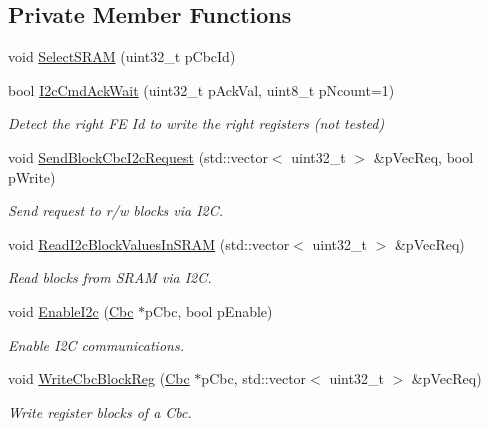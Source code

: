 \subsection*{Private Member Functions}
\begin{DoxyCompactItemize}
\item 
void \hyperlink{class_ph2___hw_interface_1_1_cbc_interface_acd3d4688c3f92b5ddd0d37456c8228df}{Select\-S\-R\-A\-M} (uint32\-\_\-t p\-Cbc\-Id)
\item 
bool \hyperlink{class_ph2___hw_interface_1_1_cbc_interface_ad171e07d3777cebcdd1f65cc03915e7b}{I2c\-Cmd\-Ack\-Wait} (uint32\-\_\-t p\-Ack\-Val, uint8\-\_\-t p\-Ncount=1)
\begin{DoxyCompactList}\small\item\em Detect the right F\-E Id to write the right registers (not tested) \end{DoxyCompactList}\item 
void \hyperlink{class_ph2___hw_interface_1_1_cbc_interface_a89fb26e8441039ffa635ce189ab034be}{Send\-Block\-Cbc\-I2c\-Request} (std\-::vector$<$ uint32\-\_\-t $>$ \&p\-Vec\-Req, bool p\-Write)
\begin{DoxyCompactList}\small\item\em Send request to r/w blocks via I2\-C. \end{DoxyCompactList}\item 
void \hyperlink{class_ph2___hw_interface_1_1_cbc_interface_a5bffbf2ff373386ed92f8823ebe2cef3}{Read\-I2c\-Block\-Values\-In\-S\-R\-A\-M} (std\-::vector$<$ uint32\-\_\-t $>$ \&p\-Vec\-Req)
\begin{DoxyCompactList}\small\item\em Read blocks from S\-R\-A\-M via I2\-C. \end{DoxyCompactList}\item 
void \hyperlink{class_ph2___hw_interface_1_1_cbc_interface_a03c443239c9ee90a9d547fbcfed89df4}{Enable\-I2c} (\hyperlink{class_ph2___hw_description_1_1_cbc}{Cbc} $\ast$p\-Cbc, bool p\-Enable)
\begin{DoxyCompactList}\small\item\em Enable I2\-C communications. \end{DoxyCompactList}\item 
void \hyperlink{class_ph2___hw_interface_1_1_cbc_interface_a0829d7f94889de251860cae3f5f9d565}{Write\-Cbc\-Block\-Reg} (\hyperlink{class_ph2___hw_description_1_1_cbc}{Cbc} $\ast$p\-Cbc, std\-::vector$<$ uint32\-\_\-t $>$ \&p\-Vec\-Req)
\begin{DoxyCompactList}\small\item\em Write register blocks of a Cbc. \end{DoxyCompactList}\item 

\end{DoxyCompactItemize}
